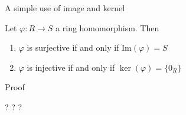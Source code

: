 \documentclass{beamer}
\begin{document}
\begin{frame}{A simple use of image and kernel}

  \begin{lemma} Let $\varphi:R\to S$ a ring homomorphism.  Then

    \begin{enumerate}
    \item $\varphi$ is surjective if and only if $\text{Im}(\varphi)=S$
      \item $\varphi$ is injective if and only if $\ker(\varphi)=\{0_R\}$
      \end{enumerate}
\end{lemma}

\begin{block}{Proof}
\begin{center} ? ? ? \end{center}
\end{block}  
  \end{frame}
\end{document}
